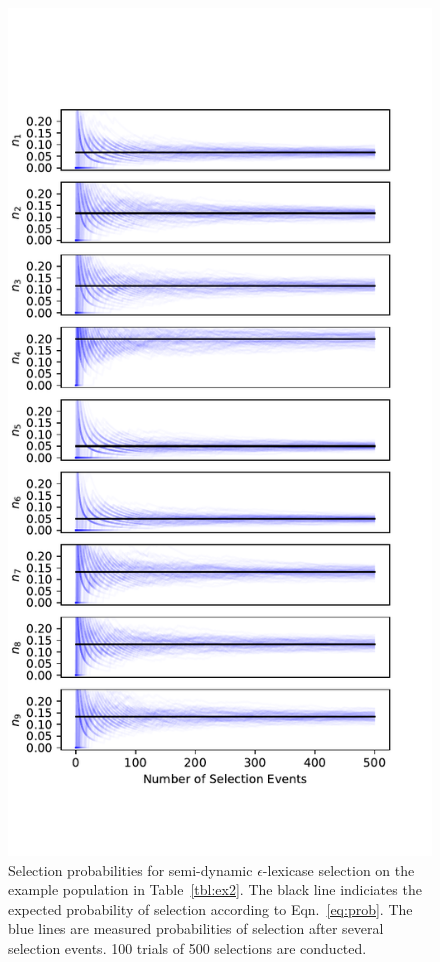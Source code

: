 \documentclass[twoside]{article}
\begin{document}
\begin{figure}
\centering
  \includegraphics[height = 0.6\textheight]{figs/eplex_semi_probability_convergence_500selections.pdf}
  \caption{Selection probabilities for semi-dynamic $\epsilon$-lexicase selection on the example population in Table~\ref{tbl:ex2}. The black line indiciates the expected probability of selection according to Eqn.~\ref{eq:prob}. The blue lines are measured probabilities of selection after several selection events. 100 trials of 500 selections are conducted.} \label{fig:prob_converge}
\end{figure}
\end{document}
